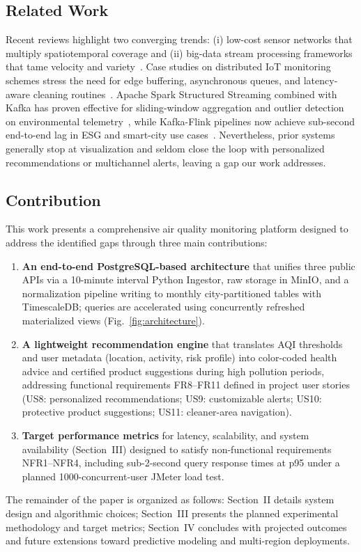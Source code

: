 \subsection{Related Work}

Recent reviews highlight two converging trends: (i) low-cost sensor networks that multiply spatiotemporal coverage and (ii) big-data stream processing frameworks that tame velocity and variety~\cite{wiley}. Case studies on distributed IoT monitoring schemes stress the need for edge buffering, asynchronous queues, and latency-aware cleaning routines~\cite{mdpi}. Apache Spark Structured Streaming combined with Kafka has proven effective for sliding-window aggregation and outlier detection on environmental telemetry~\cite{medium}, while Kafka-Flink pipelines now achieve sub-second end-to-end lag in ESG and smart-city use cases~\cite{esr}. Nevertheless, prior systems generally stop at visualization and seldom close the loop with personalized recommendations or multichannel alerts, leaving a gap our work addresses.

\subsection{Contribution}

This work presents a comprehensive air quality monitoring platform designed to address the identified gaps through three main contributions:

\begin{enumerate}
    \item \textbf{An end-to-end PostgreSQL-based architecture} that unifies three public APIs via a 10-minute interval Python Ingestor, raw storage in MinIO, and a normalization pipeline writing to monthly city-partitioned tables with TimescaleDB; queries are accelerated using concurrently refreshed materialized views (Fig.~\ref{fig:architecture}).
    \item \textbf{A lightweight recommendation engine} that translates AQI thresholds and user metadata (location, activity, risk profile) into color-coded health advice and certified product suggestions during high pollution periods, addressing functional requirements FR8–FR11 defined in project user stories (US8: personalized recommendations; US9: customizable alerts; US10: protective product suggestions; US11: cleaner-area navigation).
    \item \textbf{Target performance metrics} for latency, scalability, and system availability (Section~III) designed to satisfy non-functional requirements NFR1–NFR4, including sub-2-second query response times at p95 under a planned 1000-concurrent-user JMeter load test.
\end{enumerate}


The remainder of the paper is organized as follows: Section~II details system design and algorithmic choices; Section~III presents the planned experimental methodology and target metrics; Section~IV concludes with projected outcomes and future extensions toward predictive modeling and multi-region deployments.
